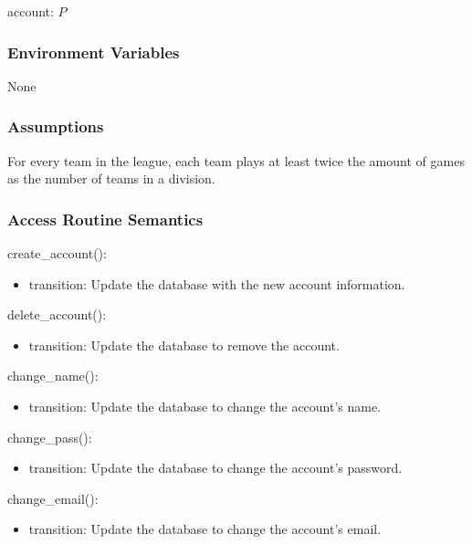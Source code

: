 \documentclass[12pt, titlepage]{article}
\begin{document}
account: $P$

\subsubsection{Environment Variables}

None

\subsubsection{Assumptions}

For every team in the league, each team plays at least twice the amount of games
as the number of teams in a division.



\subsubsection{Access Routine Semantics}

\noindent create\_account():
\begin{itemize}
\item transition: Update the database with the new account information.
\end{itemize}

\noindent delete\_account():
\begin{itemize}
\item transition: Update the database to remove the account.
\end{itemize}

\noindent change\_name():
\begin{itemize}
\item transition: Update the database to change the account's name.
\end{itemize}

\noindent change\_pass():
\begin{itemize}
\item transition: Update the database to change the account's password.
\end{itemize}

\noindent change\_email():
\begin{itemize}
\item transition: Update the database to change the account's email.
\end{itemize}
\end{document}
